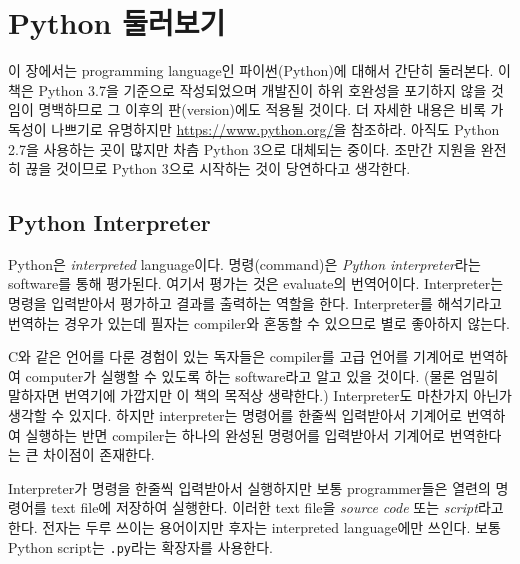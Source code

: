 \section{Python 둘러보기}

이 장에서는 programming language인 파이썬(Python)에 대해서 간단히 둘러본다. 이 책은 Python 3.7을 기준으로 작성되었으며 개발진이 하위 호완성을 포기하지 않을 것임이 명백하므로 그 이후의 판(version)에도 적용될 것이다. 더 자세한 내용은 비록 가독성이 나쁘기로 유명하지만 \url{https://www.python.org/}을 참조하라.
아직도 Python 2.7을 사용하는 곳이 많지만 차츰 Python 3으로 대체되는 중이다. 조만간 지원을 완전히 끊을 것이므로 Python 3으로 시작하는 것이 당연하다고 생각한다.

\subsection{Python Interpreter}

Python은 \emph{interpreted} language이다. 명령(command)은 \emph{Python interpreter}라는 software를 통해 평가된다. 여기서 평가는 것은 evaluate의 번역어이다. Interpreter는 명령을 입력받아서 평가하고 결과를 출력하는 역할을 한다. Interpreter를 해석기라고 번역하는 경우가 있는데 필자는 compiler와 혼동할 수 있으므로 별로 좋아하지 않는다.

C와 같은 언어를 다룬 경험이 있는 독자들은 compiler를 고급 언어를 기계어로 번역하여 computer가 실행할 수 있도록 하는 software라고 알고 있을 것이다. (물론 엄밀히 말하자면 번역기에 가깝지만 이 책의 목적상 생략한다.) Interpreter도 마찬가지 아닌가 생각할 수 있지다. 하지만 interpreter는 명령어를 한줄씩 입력받아서 기계어로 번역하여 실행하는 반면 compiler는 하나의 완성된 명령어를 입력받아서 기계어로 번역한다는 큰 차이점이 존재한다.

Interpreter가 명령을 한줄씩 입력받아서 실행하지만 보통 programmer들은 열련의 명령어를 text file에 저장하여 실행한다. 이러한 text file을 \emph{source code} 또는 \emph{script}라고 한다. 전자는 두루 쓰이는 용어이지만 후자는 interpreted language에만 쓰인다.
보통 Python script는 \verb|.py|라는 확장자를 사용한다.